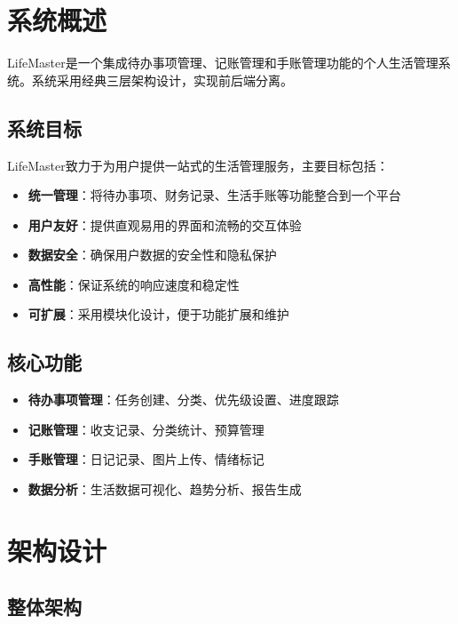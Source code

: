 \documentclass[a4paper]{article}
\begin{document}
\section{系统概述}

LifeMaster是一个集成待办事项管理、记账管理和手账管理功能的个人生活管理系统。系统采用经典三层架构设计，实现前后端分离。

\subsection{系统目标}

LifeMaster致力于为用户提供一站式的生活管理服务，主要目标包括：

\begin{itemize}
    \item \textbf{统一管理}：将待办事项、财务记录、生活手账等功能整合到一个平台
    \item \textbf{用户友好}：提供直观易用的界面和流畅的交互体验
    \item \textbf{数据安全}：确保用户数据的安全性和隐私保护
    \item \textbf{高性能}：保证系统的响应速度和稳定性
    \item \textbf{可扩展}：采用模块化设计，便于功能扩展和维护
\end{itemize}

\subsection{核心功能}

\begin{itemize}
    \item \textbf{待办事项管理}：任务创建、分类、优先级设置、进度跟踪
    \item \textbf{记账管理}：收支记录、分类统计、预算管理
    \item \textbf{手账管理}：日记记录、图片上传、情绪标记
    \item \textbf{数据分析}：生活数据可视化、趋势分析、报告生成
\end{itemize}

\section{架构设计}

\subsection{整体架构}
\end{document}
